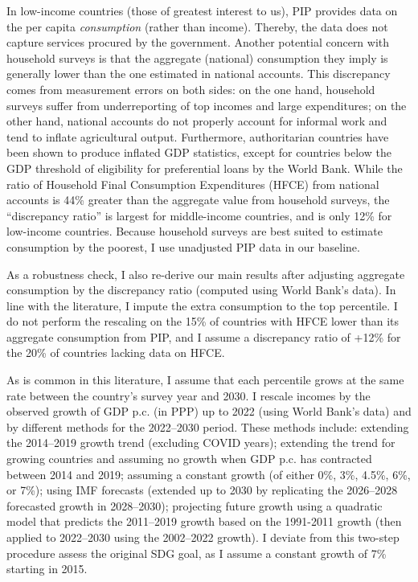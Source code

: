 In low-income countries (those of greatest interest to us), PIP provides data on the per capita \textit{consumption} (rather than income). Thereby, the data does not capture services procured by the government. Another potential concern with household surveys is that the aggregate (national) consumption they imply is generally lower than the one estimated in national accounts. This discrepancy comes from measurement errors on both sides: on the one hand, household surveys suffer from underreporting of top incomes and large expenditures; on the other hand, national accounts do not properly account for informal work %
and tend to inflate agricultural output.\cite{deaton_measuring_2005,prydz_disparities_2022-1} %
Furthermore, authoritarian countries have been shown to produce inflated GDP statistics, except for countries below the GDP threshold of eligibility for preferential loans by the World Bank. %
While the ratio of Household Final Consumption Expenditures (HFCE) from national accounts is 44\% greater than the aggregate value from household surveys, the ``discrepancy ratio'' is largest for middle-income countries, and is only 12\% for low-income countries. %
Because household surveys are best suited to estimate consumption by the poorest, I use unadjusted PIP data in our baseline. 

As a robustness check, I also re-derive our main results after adjusting aggregate consumption by the discrepancy ratio (computed using World Bank's data). In line with the literature,\cite{lakner_global_2013,anand_chapter_2015} I impute the extra consumption to the top percentile. I do not perform the rescaling on the 15\% of countries with HFCE lower than its aggregate consumption from PIP, and I assume a discrepancy ratio of +12\% for the 20\% of countries lacking data on HFCE. 

As is common in this literature, I assume that each percentile grows at the same rate between the country's survey year and 2030. 
I rescale incomes by the observed growth of GDP p.c. (in PPP) up to 2022 (using World Bank's data) and by different methods for the 2022--2030 period. 
These methods include: extending the 2014--2019 growth trend (excluding COVID years); extending the trend for growing countries and assuming no growth when GDP p.c. has contracted between 2014 and 2019; assuming a constant growth (of either 0\%, 3\%, 4.5\%, 6\%, or 7\%); using IMF forecasts (extended up to 2030 by replicating the 2026--2028 forecasted growth in 2028--2030); projecting future growth using a quadratic model that predicts the 2011--2019 growth based on the 1991-2011 growth (then applied to 2022--2030 using the 2002--2022 growth). I deviate from this two-step procedure assess the original SDG goal, as I assume a constant growth of 7\% starting in 2015.



